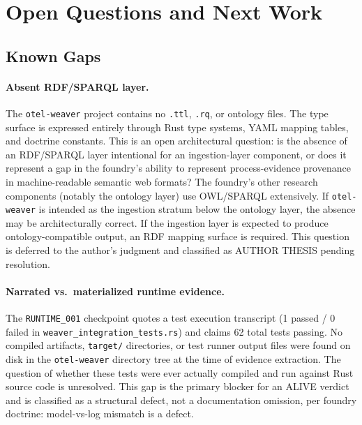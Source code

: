 
\section{Open Questions and Next Work}
\label{sec:otel-weaver-open}

\subsection{Known Gaps}
\label{sec:otel-weaver-open-gaps}

\paragraph{Absent RDF/SPARQL layer.}
\label{sec:otel-weaver-open-rdf}
The \texttt{otel-weaver} project contains no \texttt{.ttl}, \texttt{.rq}, or ontology files.
The type surface is expressed entirely through Rust type systems, YAML mapping tables, and
doctrine constants. This is an open architectural question: is the absence of an RDF/SPARQL
layer intentional for an ingestion-layer component, or does it represent a gap in the foundry's
ability to represent process-evidence provenance in machine-readable semantic web formats? The
foundry's other research components (notably the ontology layer) use OWL/SPARQL extensively.
If \texttt{otel-weaver} is intended as the ingestion stratum below the ontology layer, the
absence may be architecturally correct. If the ingestion layer is expected to produce
ontology-compatible output, an RDF mapping surface is required. This question is deferred to
the author's judgment and classified as AUTHOR THESIS pending resolution.

\paragraph{Narrated vs.\ materialized runtime evidence.}
The \texttt{RUNTIME\_001} checkpoint quotes a test execution transcript (1 passed / 0 failed in
\texttt{weaver\_integration\_tests.rs}) and claims 62 total tests passing. No compiled artifacts,
\texttt{target/} directories, or test runner output files were found on disk in the
\texttt{otel-weaver} directory tree at the time of evidence extraction. The question of whether
these tests were ever actually compiled and run against Rust source code is unresolved.
This gap is the primary blocker for an ALIVE verdict and is classified as a structural defect,
not a documentation omission, per foundry doctrine: model-vs-log mismatch is a defect.

